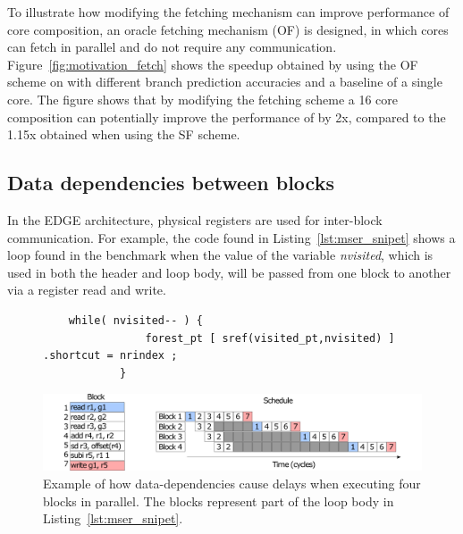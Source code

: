 To illustrate how modifying the fetching mechanism can improve performance of core composition, an oracle fetching mechanism (OF) is designed, in which cores can fetch in parallel and do not require any communication.
Figure~\ref{fig:motivation_fetch} shows the speedup obtained by using the OF scheme on  with different branch prediction accuracies and a baseline of a single core.
The figure shows that by modifying the fetching scheme a 16 core composition can potentially improve the performance of  by 2x, compared to the 1.15x obtained when using the SF scheme.

\subsection{Data dependencies between blocks}

In the EDGE architecture, physical registers are used for inter-block communication.
For example, the code found in Listing~\ref{lst:mser_snipet} shows a loop found in the  benchmark when the value of the variable \textit{nvisited}, which is used in both the header and loop body, will be passed from one block to another via a register read and write.


\begin{figure}[t]
\lstset{language=C,numbersep=4pt}
\begin{center}
\begin{lstlisting}
	while( nvisited-- ) {
				forest_pt [ sref(visited_pt,nvisited) ] .shortcut = nrindex ;
			}
\end{lstlisting}
\end{center}
\vspace{-2em}
\label{lst:mser_snipet}
    \centering
    \includegraphics[width=1\textwidth]{chapter3/graphics/mser_ex.pdf}
    \caption{Example of how data-dependencies cause delays when executing four blocks in parallel. The blocks represent part of the loop body in Listing~\ref{lst:mser_snipet}.}
    \label{fig:mser_nvsited}
	\vspace{1em}
\end{figure}

